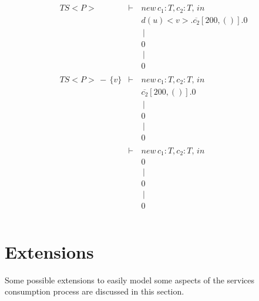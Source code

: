 \begin{eqnarray*}
 \               &        &          \\
 \ TS<P> &\vdash\,& new\,c_1:T,c_2:T,\,in\; \\
 \   &        & d(u)<v>.\overline{c_2}[200,()].0         \\
 \          &        &    \,|\,      \\
 \               &        & 0 \\
 \               &        &    \,|\,      \\
 \               &        & 0 \\
 \               &        &          \\
 \ TS<P>\,-\,\{v\} &\vdash\,& new\,c_1:T,c_2:T,\,in\; \\
 \    &        & \overline{c_2}[200,()].0         \\
 \         &        &    \,|\,      \\
 \               &        & 0 \\
 \               &        &    \,|\,      \\
 \               &        & 0 \\
 \               &        &          \\
 \  &\vdash\,& new\,c_1:T,c_2:T,\,in\; \\
 \    &        & 0         \\
 \         &        &    \,|\,      \\
 \               &        & 0 \\
 \               &        &    \,|\,      \\
 \               &        & 0 \\
 \               &        &          \\
\end{eqnarray*}

\section{Extensions}
Some possible extensions to easily model some aspects of the services consumption process are discussed in this section.


